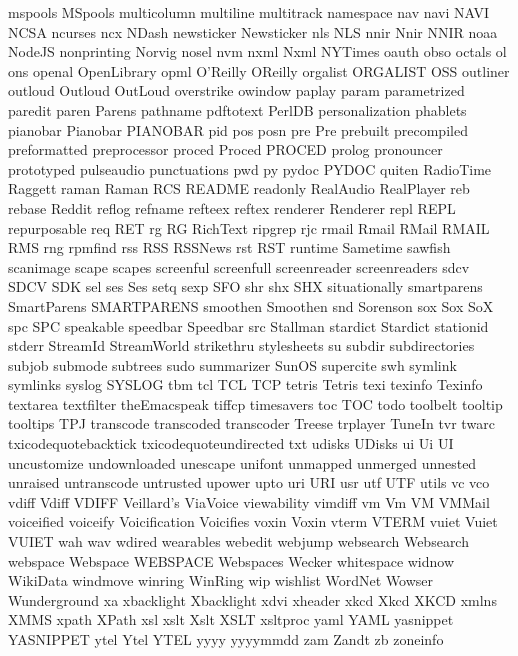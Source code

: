mspools
MSpools
multicolumn
multiline
multitrack
namespace
nav
navi
NAVI
NCSA
ncurses
ncx
NDash
newsticker
Newsticker
nls
NLS
nnir
Nnir
NNIR
noaa
NodeJS
nonprinting
Norvig
nosel
nvm
nxml
Nxml
NYTimes
oauth
obso
octals
ol
ons
openal
OpenLibrary
opml
O'Reilly
OReilly
orgalist
ORGALIST
OSS
outliner
outloud
Outloud
OutLoud
overstrike
owindow
paplay
param
parametrized
paredit
paren
Parens
pathname
pdftotext
PerlDB
personalization
phablets
pianobar
Pianobar
PIANOBAR
pid
pos
posn
pre
Pre
prebuilt
precompiled
preformatted
preprocessor
proced
Proced
PROCED
prolog
pronouncer
prototyped
pulseaudio
punctuations
pwd
py
pydoc
PYDOC
quiten
RadioTime
Raggett
raman
Raman
RCS
README
readonly
RealAudio
RealPlayer
reb
rebase
Reddit
reflog
refname
refteex
reftex
renderer
Renderer
repl
REPL
repurposable
req
RET
rg
RG
RichText
ripgrep
rjc
rmail
Rmail
RMail
RMAIL
RMS
rng
rpmfind
rss
RSS
RSSNews
rst
RST
runtime
Sametime
sawfish
scanimage
scape
scapes
screenful
screenfull
screenreader
screenreaders
sdcv
SDCV
SDK
sel
ses
Ses
setq
sexp
SFO
shr
shx
SHX
situationally
smartparens
SmartParens
SMARTPARENS
smoothen
Smoothen
snd
Sorenson
sox
Sox
SoX
spc
SPC
speakable
speedbar
Speedbar
src
Stallman
stardict
Stardict
stationid
stderr
StreamId
StreamWorld
strikethru
stylesheets
su
subdir
subdirectories
subjob
submode
subtrees
sudo
summarizer
SunOS
supercite
swh
symlink
symlinks
syslog
SYSLOG
tbm
tcl
TCL
TCP
tetris
Tetris
texi
texinfo
Texinfo
textarea
textfilter
theEmacspeak
tiffcp
timesavers
toc
TOC
todo
toolbelt
tooltip
tooltips
TPJ
transcode
transcoded
transcoder
Treese
trplayer
TuneIn
tvr
twarc
txicodequotebacktick
txicodequoteundirected
txt
udisks
UDisks
ui
Ui
UI
uncustomize
undownloaded
unescape
unifont
unmapped
unmerged
unnested
unraised
untranscode
untrusted
upower
upto
uri
URI
usr
utf
UTF
utils
vc
vco
vdiff
Vdiff
VDIFF
Veillard's
ViaVoice
viewability
vimdiff
vm
Vm
VM
VMMail
voiceified
voiceify
Voicification
Voicifies
voxin
Voxin
vterm
VTERM
vuiet
Vuiet
VUIET
wah
wav
wdired
wearables
webedit
webjump
websearch
Websearch
webspace
Webspace
WEBSPACE
Webspaces
Wecker
whitespace
widnow
WikiData
windmove
winring
WinRing
wip
wishlist
WordNet
Wowser
Wunderground
xa
xbacklight
Xbacklight
xdvi
xheader
xkcd
Xkcd
XKCD
xmlns
XMMS
xpath
XPath
xsl
xslt
Xslt
XSLT
xsltproc
yaml
YAML
yasnippet
YASNIPPET
ytel
Ytel
YTEL
yyyy
yyyymmdd
zam
Zandt
zb
zoneinfo
